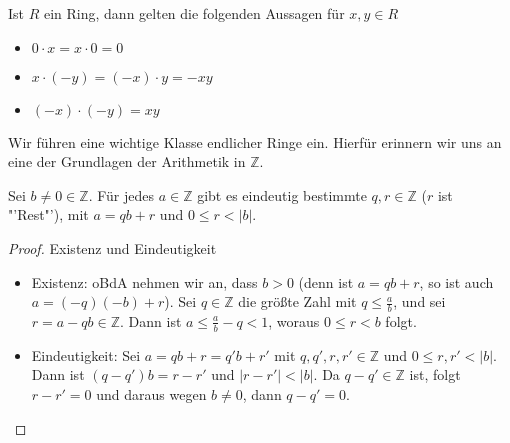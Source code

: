 \begin{remark}
	Ist $R$ ein Ring, dann gelten die folgenden Aussagen für $x,y \in R$
	\begin{itemize}
		\item $0 \cdot x=x \cdot 0 = 0$
		\item $x \cdot (-y) = (-x) \cdot y = -xy$
		\item $(-x) \cdot (-y) = xy$
	\end{itemize}
\end{remark}

\begin{remark}
	Wir führen eine wichtige Klasse endlicher Ringe ein. Hierfür erinnern wir uns an eine der Grundlagen
	der Arithmetik in $\mathbb{Z}$.
\end{remark}

\begin{theorem}
	Sei $b \neq 0 \in \mathbb{Z}$. Für jedes $a \in \mathbb{Z}$ gibt es 
	eindeutig bestimmte $q,r \in \mathbb{Z}$ ($r$ ist "'Rest"'), mit $a=qb+r$ und $0 \le r < \vert b\vert$.
\end{theorem}
\begin{proof}
	Existenz und Eindeutigkeit
	\begin{itemize}
		\item Existenz: oBdA nehmen wir an, dass $b>0$ (denn ist $a=qb+r$, so ist auch $a=(-q)(-b)+r$). Sei $q \in
		\mathbb{Z}$ die größte Zahl mit $q \le \frac{a}{b}$, und sei $r=a-qb \in \mathbb{Z}$. Dann ist
		$a \le \frac{a}{b}-q < 1$, woraus $0 \le r < b$ folgt.
		\item Eindeutigkeit: Sei $a=qb+r=q'b+r'$ mit $q,q',r,r' \in \mathbb{Z}$ und $0 \le r,r' < |b|$. Dann ist
		$(q-q')b=r-r'$ und $|r-r'|<|b|$. Da $q-q' \in \mathbb{Z}$ ist, folgt $r-r'=0$ und daraus wegen 
		$b \neq 0$, dann $q-q'=0$.
	\end{itemize}
\end{proof}

